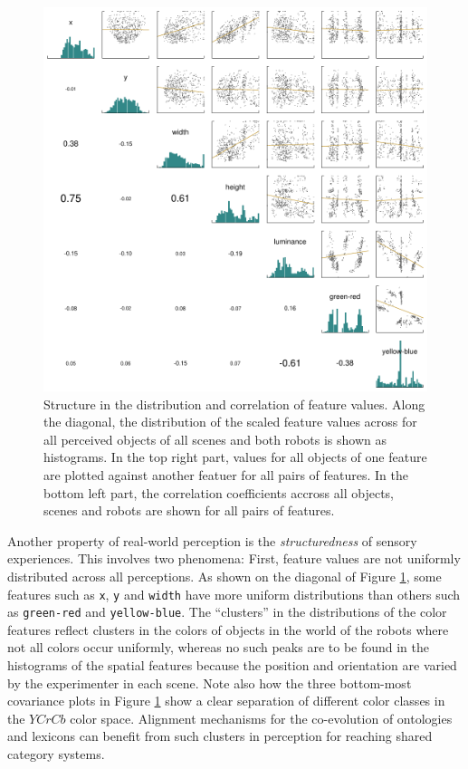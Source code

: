 \begin{figure}[p]
  \includegraphics[width=\textwidth]{figures/data-sets-correlation-matrix}

  \caption{Structure in the distribution and correlation of feature
    values. Along the diagonal, the distribution of the scaled feature
    values across for all perceived objects of all scenes and both
    robots is shown as histograms. In the top right part, values for
    all objects of one feature are plotted against another featuer for
    all pairs of features. In the bottom left part, the correlation
    coefficients accross all objects, scenes and robots are shown for
    all pairs of features. }
  \label{f:data-sets-correlation-matrix}
\end{figure}


Another property of real-world perception is the \emph{structuredness}
of sensory experiences. This involves two phenomena: First, feature
values are not uniformly distributed across all perceptions. As shown
on the diagonal of Figure \ref{f:data-sets-correlation-matrix}, some
features such as \texttt{x}, \texttt{y} and \texttt{width} have more
uniform distributions than others such as \texttt{green-red} and
\texttt{yellow-blue}. The ``clusters'' in the distributions of the
color features reflect clusters in the colors of objects in the world
of the robots where not all colors occur uniformly, whereas no such
peaks are to be found in the histograms of the spatial features
because the position and orientation are varied by the experimenter in
each scene. Note also how the three bottom-most covariance plots in
Figure \ref{f:data-sets-correlation-matrix} show a clear separation of
different color classes in the $YCrCb$ color space. Alignment
mechanisms for the co-evolution of ontologies and lexicons can benefit
from such clusters in perception for reaching shared category systems.

